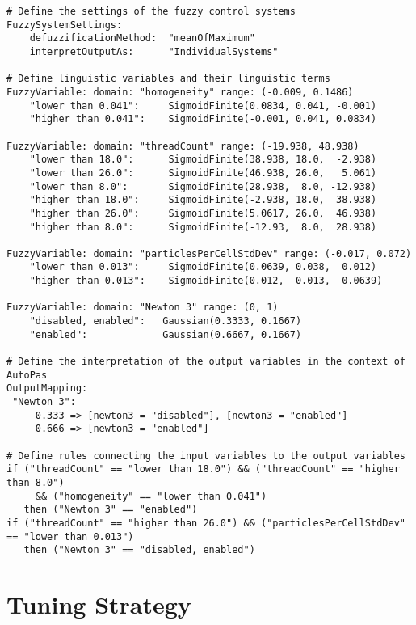 \begin{lstlisting}[caption={Demonstration of the domain-specific language used for Fuzzy Tuning},label={lst:rulefile},language=FuzzyLanguage]
# Define the settings of the fuzzy control systems
FuzzySystemSettings:
    defuzzificationMethod:  "meanOfMaximum"
    interpretOutputAs:      "IndividualSystems"

# Define linguistic variables and their linguistic terms
FuzzyVariable: domain: "homogeneity" range: (-0.009, 0.1486)
    "lower than 0.041":     SigmoidFinite(0.0834, 0.041, -0.001)
    "higher than 0.041":    SigmoidFinite(-0.001, 0.041, 0.0834)

FuzzyVariable: domain: "threadCount" range: (-19.938, 48.938)
    "lower than 18.0":      SigmoidFinite(38.938, 18.0,  -2.938)
    "lower than 26.0":      SigmoidFinite(46.938, 26.0,   5.061)
    "lower than 8.0":       SigmoidFinite(28.938,  8.0, -12.938)
    "higher than 18.0":     SigmoidFinite(-2.938, 18.0,  38.938)
    "higher than 26.0":     SigmoidFinite(5.0617, 26.0,  46.938)
    "higher than 8.0":      SigmoidFinite(-12.93,  8.0,  28.938)
     
FuzzyVariable: domain: "particlesPerCellStdDev" range: (-0.017, 0.072)
    "lower than 0.013":     SigmoidFinite(0.0639, 0.038,  0.012)
    "higher than 0.013":    SigmoidFinite(0.012,  0.013,  0.0639)
  
FuzzyVariable: domain: "Newton 3" range: (0, 1)
    "disabled, enabled":   Gaussian(0.3333, 0.1667)
    "enabled":             Gaussian(0.6667, 0.1667)
      
# Define the interpretation of the output variables in the context of AutoPas
OutputMapping:
 "Newton 3":
     0.333 => [newton3 = "disabled"], [newton3 = "enabled"]
     0.666 => [newton3 = "enabled"]

# Define rules connecting the input variables to the output variables
if ("threadCount" == "lower than 18.0") && ("threadCount" == "higher than 8.0") 
     && ("homogeneity" == "lower than 0.041")
   then ("Newton 3" == "enabled")
if ("threadCount" == "higher than 26.0") && ("particlesPerCellStdDev" == "lower than 0.013")
   then ("Newton 3" == "disabled, enabled")
\end{lstlisting}



\section{Tuning Strategy}


